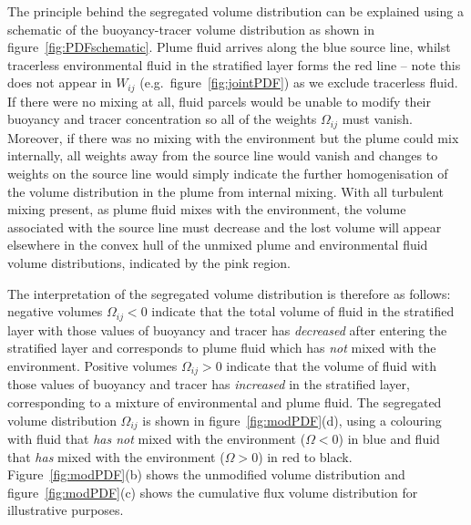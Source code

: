\documentclass[a4paper]{article}
\begin{document}
The principle behind the segregated volume distribution can be explained using a schematic of the
buoyancy-tracer volume distribution as shown in figure~\ref{fig:PDFschematic}. Plume fluid arrives along the
blue source line, whilst tracerless environmental fluid in the stratified layer forms the red line -- note
this does not appear in $W_{ij}$ (e.g.\ figure~\ref{fig:jointPDF}) as we exclude tracerless fluid. If there
were no mixing at all, fluid parcels would be unable to modify their buoyancy and tracer concentration so all
of the weights $\Omega_{ij}$ must vanish.  Moreover, if there was no mixing with the environment but the plume
could mix internally, all weights away from the source line would vanish and changes to weights on the source
line would simply indicate the further homogenisation of the volume distribution in the plume from internal
mixing. With all turbulent mixing present, as plume fluid mixes with the environment, the volume associated
with the source line must decrease and the lost volume will appear elsewhere in the convex hull of the unmixed
plume and environmental fluid volume distributions, indicated by the pink region. 

The interpretation of the segregated volume distribution is therefore as follows: negative volumes
$\Omega_{ij} < 0$ indicate that the total volume of fluid in the stratified layer with those values of
buoyancy and tracer has \emph{decreased} after entering the stratified layer and corresponds to plume fluid
which has \emph{not} mixed with the environment.  Positive volumes $\Omega_{ij} > 0$ indicate that the volume
of fluid with those values of buoyancy and tracer has \emph{increased} in the stratified layer, corresponding
to a mixture of environmental and plume fluid. The segregated volume distribution $\Omega_{ij}$ is shown in
figure~\ref{fig:modPDF}(d), using a colouring with fluid that \emph{has not} mixed with the environment
($\Omega < 0$) in blue and fluid that \emph{has} mixed with the environment ($\Omega > 0$) in red to black.
Figure~\ref{fig:modPDF}(b) shows the unmodified volume distribution and figure~\ref{fig:modPDF}(c) shows the
cumulative flux volume distribution for illustrative purposes.
\end{document}
